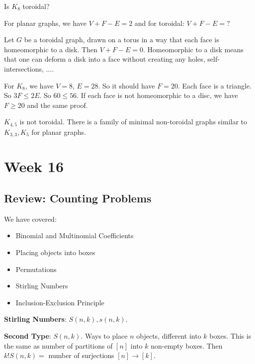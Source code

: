 \documentclass{report}
\begin{document}
Is $K_{8}$ toroidal? 

For planar graphs, we have $V + F - E = 2$ and for toroidal: $V + F - E = ?$

\begin{theorem}{}
    Let $G$ be a toroidal graph, drawn on a torus in a way that each face is homeomorphic to a disk. Then $V + F - E = 0$. Homeomorphic to a disk means that one can deform a disk into a face without creating any holes, self-intersections, $\ldots$.
\end{theorem}

For $K_{8}$, we have $V = 8$, $E = 28$. So it should have $F = 20$. Each face is a triangle. So $3F \leq 2E$. So $60 \leq 56$. If each face is not homeomorphic to a disc, we have $F \geq 20$ and the same proof.

$K_{4, 5}$ is not toroidal. There is a family of minimal non-toroidal graphs similar to $K_{3 ,3}, K_{5}$ for planar graphs.

\chapter{Week 16}

\begin{topic}
    \section{Review: Counting Problems}
\end{topic}

We have covered:
    \begin{itemize}
        \item Binomial and Multinomial Coefficients

        \item Placing objects into boxes

        \item Permutations

        \item Stirling Numbers

        \item Inclusion-Exclusion Principle 
    \end{itemize}
\textbf{Stirling Numbers}: $S(n, k), s(n, k)$. 

\textbf{Second Type}: $S(n, k)$. Ways to place $n$ objects, different into $k$ boxes. This is the same as number of partitions of $[n]$ into $k$ non-empty boxes. Then $k!S(n, k) = $ number of surjections $[n] \rightarrow [k]$. 
\end{document}
